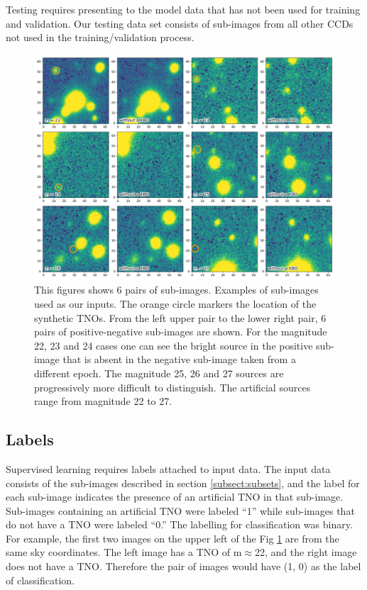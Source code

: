 Testing requires presenting to the model data that has not been used for training and validation. Our testing data set consists of sub-images from all other CCDs not used in the training/validation process. 

\begin{figure}[ht]
    \centering
    \includegraphics[width=\textwidth,keepaspectratio]{Figures/mag_examples.png}
    \caption{This figures shows 6 pairs of sub-images.
    Examples of sub-images used as our inputs. 
    The orange circle markers the location of the synthetic TNOs.
    From the left upper pair to the lower right pair, 6 pairs of positive-negative sub-images are shown.
    For the magnitude 22, 23 and 24 cases one can see the bright source in the positive sub-image that is absent in the negative sub-image taken from a different epoch.
    The magnitude 25, 26 and 27 sources are progressively more difficult to distinguish. 
    The artificial sources range from magnitude 22 to 27.}
    \label{fig:magexamples}
\end{figure}{}

\subsection{Labels}
\label{subsect:labeling}
Supervised learning requires labels attached to input data. 
The input data consists of the sub-images described in section \ref{subsect:subsets}, and the label for each sub-image indicates the presence of an artificial TNO in that sub-image.  
Sub-images containing an artificial TNO were labeled ``1'' while sub-images that do not have a TNO were labeled ``0.'' 
The labelling for classification was binary.
For example, the first two images on the upper left of the Fig \ref{fig:magexamples} are from the same sky coordinates.
The left image has a TNO of m$\approx$22, and the right image does not have a TNO. 
Therefore the pair of images would have (1, 0) as the label of classification.

